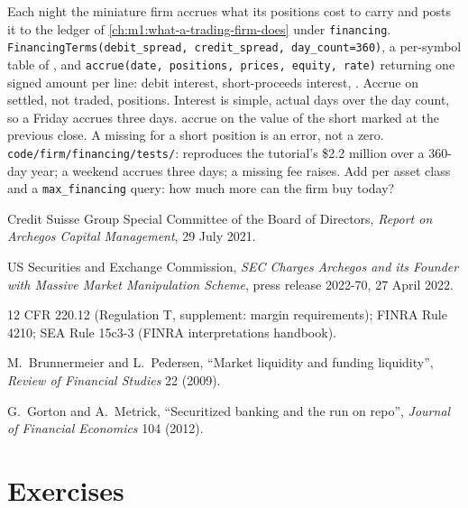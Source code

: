\begin{build}
 Each night the miniature firm accrues what its positions
cost to carry and posts it to the ledger of
\cref{ch:m1:what-a-trading-firm-does} under \texttt{financing}.
 \texttt{FinancingTerms(debit\_spread, credit\_spread,
day\_count=360)}, a per-symbol table of , and
\texttt{accrue(date, positions, prices, equity, rate)} returning one signed
amount per line: debit interest, short-proceeds interest, .
 Accrue on settled, not traded, positions. Interest is simple,
actual days over the day count, so a Friday accrues three days. 
accrue on the value of the short marked at the previous close. A missing
 for a short position is an error, not a zero.
 \texttt{code/firm/financing/tests/}: reproduces the
tutorial's \$2.2 million over a 360-day year; a weekend accrues three days;
a missing fee raises.
 Add  per asset class and a \texttt{max\_financing}
query: how much more can the firm buy today?
\end{build}

\begin{omsources}
\item Credit Suisse Group Special Committee of the Board of Directors,
\emph{Report on Archegos Capital Management}, 29 July 2021.
\item US Securities and Exchange Commission, \emph{SEC Charges Archegos and
its Founder with Massive Market Manipulation Scheme}, press release 2022-70,
27 April 2022.
\item 12 CFR 220.12 (Regulation T, supplement: margin requirements); FINRA
Rule 4210; SEA Rule 15c3-3 (FINRA interpretations handbook).
\item M.~Brunnermeier and L.~Pedersen, ``Market liquidity and funding
liquidity'', \emph{Review of Financial Studies} 22 (2009).
\item G.~Gorton and A.~Metrick, ``Securitized banking and the run on repo'',
\emph{Journal of Financial Economics} 104 (2012).
\end{omsources}

\section{Exercises}

